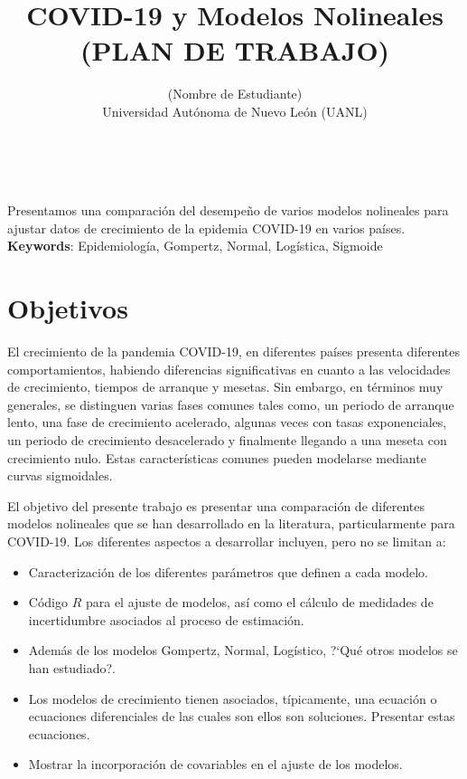 \documentclass[11pt]{article}
\title{\textbf{COVID-19 y Modelos Nolineales\\ (PLAN DE TRABAJO)}}
\author{(Nombre de Estudiante)
\\Universidad Aut\'onoma de Nuevo Le\'on (UANL)}
\date{}
\begin{document}
	\maketitle

\begin{center}
\abstractname{}\\
\end{center}
Presentamos una comparaci\'on del desempe\~no de varios modelos nolineales
para ajustar datos de crecimiento de la epidemia COVID-19
en varios pa\'ises. \\
\noindent \textbf{Keywords}: Epidemiolog\'ia, Gompertz, Normal, Log\'istica,
Sigmoide

\tableofcontents



\underline{\hspace{15cm}}


\section{Objetivos}  \label{Obj}

El crecimiento de la pandemia COVID-19,
en diferentes pa\'ises presenta diferentes comportamientos, habiendo
diferencias significativas en cuanto a las velocidades de crecimiento,
tiempos de arranque y mesetas. Sin embargo, en t\'erminos muy generales,
se distinguen varias fases comunes tales como, un periodo de arranque
lento, una fase de crecimiento acelerado, algunas veces con tasas
exponenciales, un periodo de crecimiento desacelerado y finalmente
llegando a una  meseta con crecimiento nulo. Estas caracter\'isticas
comunes pueden modelarse mediante curvas sigmoidales.

\medskip

El objetivo del presente trabajo es presentar una comparaci\'on
de diferentes modelos nolineales que se han desarrollado en la literatura,
particularmente para COVID-19. Los diferentes aspectos a desarrollar
incluyen, pero no se limitan a:
\begin{itemize}
\item Caracterizaci\'on de los diferentes par\'ametros que definen a cada modelo.
\item C\'odigo $R$ para el ajuste de modelos, as\'i como el c\'alculo
de medidades de incertidumbre asociados al proceso de estimaci\'on.
\item Adem\'as de los modelos Gompertz, Normal, Log\'istico, ?`Qu\'e
otros modelos se han estudiado?.
\item Los modelos de crecimiento tienen asociados, t\'ipicamente,
una ecuaci\'on o ecuaciones diferenciales de las cuales son ellos son
soluciones. Presentar estas ecuaciones.
\item Mostrar la incorporaci\'on de covariables en el ajuste de los modelos.
\end{itemize}
\end{document}
